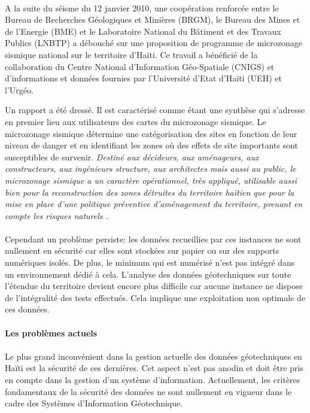 \paragraph{}
A la suite du séisme du 12 janvier 2010, une coopération renforcée entre le Bureau de
Recherches Géologiques et Minières (BRGM), le Bureau des Mines et de l’Energie (BME) et le
Laboratoire National du Bâtiment et des Travaux Publics (LNBTP) a débouché sur une
proposition de programme de microzonage sismique national sur le territoire d’Haïti.
Ce travail a bénéficié de la collaboration du
Centre National d’Information Géo-Spatiale (CNIGS) et d’informations et données fournies par
l’Université d’Etat d’Haïti (UEH) et l'Urgéo.
\par 
Un rapport \cite{bertil63100equipe} a été dressé. Il est caractérisé comme étant une synthèse qui s’adresse en premier 
lieu aux utilisateurs des cartes du microzonage sismique.
Le microzonage sismique détermine une catégorisation des sites
en fonction de leur niveau de danger et en identifiant les zones où des effets de site
importants sont susceptibles de survenir.
\textit{
         Destiné aux décideurs, aux aménageurs, aux
constructeurs, aux ingénieurs structure, aux architectes mais aussi au public, le microzonage
sismique a un caractère opérationnel, très appliqué, utilisable aussi bien pour la
reconstruction des zones détruites du territoire haïtien que pour la mise en place d’une
politique préventive d’aménagement du territoire, prenant en compte les risques naturels
\cite{bertil63100equipe}.
}

\paragraph{}
Cependant un problème persiste: les données recueillies par ces instances
ne sont nullement en sécurité car elles sont stockées sur papier ou sur des supports numériques isolés.
De plus, le minimum qui est numérisé n'est pas intégré dans un environnement 
dédié à cela.
L'analyse des données géotechniques sur toute l'étendue du territoire devient
encore plus difficile car aucune instance ne dispose de l'intégralité des tests effectués.
Cela implique une exploitation non optimale de ces données.
\paragraph{Les problèmes actuels}
\paragraph{}
Le plus grand inconvénient dans la gestion actuelle des données géotechniques
en Haïti est la sécurité de ces dernières. 
Cet aspect n'est pas anodin et doit être pris en compte dans la gestion d'un système
d'information.
Actuellement, les critères fondamentaux de la sécurité des données ne sont nullement en 
vigueur dans le cadre des Systèmes d'Information Géotechnique.

